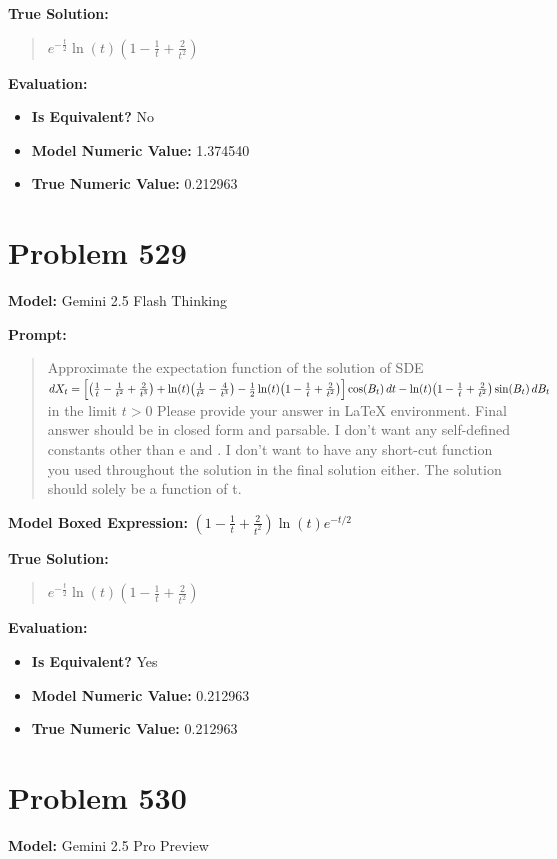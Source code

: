 \documentclass{article}
\begin{document}
\textbf{True Solution:}
\begin{quote}
$e^{-\frac{t}{2}} \ln(t) (1 - \frac{1}{t} + \frac{2}{t^2})$
\end{quote}

\textbf{Evaluation:}
\begin{itemize}
\item \textbf{Is Equivalent?} No
\item \textbf{Model Numeric Value:} 1.374540
\item \textbf{True Numeric Value:} 0.212963
\end{itemize}
\vspace{1cm}
\section*{Problem 529}
\textbf{Model:} Gemini 2.5 Flash Thinking

\textbf{Prompt:}
\begin{quote}
Approximate the expectation function of the solution of SDE $dX_t = \Bigl[\bigl(\frac1t-\frac1{t^2}+\frac2{t^3}\bigr)+\ln(t)\bigl(\frac1{t^2}-\frac4{t^3}\bigr)-\tfrac12\ln(t)\bigl(1-\frac1t+\frac2{t^2}\bigr)\Bigr]\cos(B_t)\,dt - \ln(t)\bigl(1-\frac1t+\frac2{t^2}\bigr)\sin(B_t)\,dB_t$ in the limit $ t > 0$ Please provide your answer in LaTeX \boxed{} environment. Final answer should be in closed form and parsable. I don't want any self-defined constants other than e and \pi. I don't want to have any short-cut function you used throughout the solution in the final solution either. The solution should solely be a function of t.
\end{quote}
\textbf{Model Boxed Expression:} $\left(1-\frac{1}{t}+\frac{2}{t^2}\right)\ln(t)e^{-t/2}$

\textbf{True Solution:}
\begin{quote}
$e^{-\frac{t}{2}} \ln(t) (1 - \frac{1}{t} + \frac{2}{t^2})$
\end{quote}

\textbf{Evaluation:}
\begin{itemize}
\item \textbf{Is Equivalent?} Yes
\item \textbf{Model Numeric Value:} 0.212963
\item \textbf{True Numeric Value:} 0.212963
\end{itemize}
\vspace{1cm}
\section*{Problem 530}
\textbf{Model:} Gemini 2.5 Pro Preview
\end{document}

